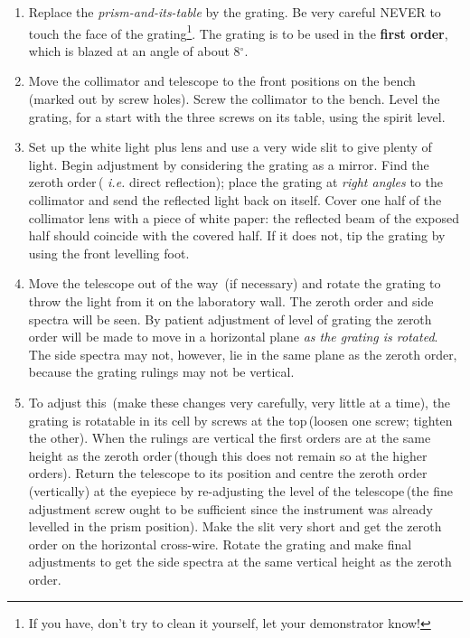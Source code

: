 \documentclass[12pt]{article}
\newcommand{\ie}{ {\em i.e. }}
\begin{document}
\begin{enumerate}

\item Replace the {\sl prism-and-its-table} by the grating. Be very careful NEVER to touch the face of the grating\footnote{If you have, don't try to clean it yourself, let your demonstrator know!}. The grating is to be used in the {\bf first order}, which is blazed at an angle of about 8$^\circ$.

\item Move the collimator and telescope to the front positions on the bench\,(marked out  by screw holes). Screw the collimator to the bench. Level the grating, for a start with the three screws on its table, using the spirit level.

\item Set up the white light plus lens and use a very wide slit to give plenty of light. Begin  adjustment by considering the grating as a mirror. Find the zeroth order\,(\ie direct reflection); place the grating at {\sl right angles} to the collimator and send the reflected light back on itself. Cover one half of the collimator lens with a piece of white paper: the reflected beam of the exposed half should coincide with the covered half. If it does not, tip the grating by using the front levelling foot.

\item Move the telescope out of the way~(if necessary) and rotate the grating to throw the light from it on the laboratory wall. The zeroth order and side spectra will be seen. By patient adjustment of level of grating the zeroth order will be made to move in a horizontal plane {\sl as the grating is rotated}. The side spectra may not, however, lie in the same plane as the zeroth order, because the grating rulings may not be vertical.

\item To adjust this~(make these changes very carefully, very little at a time), the grating is rotatable in its cell by screws at the top\,(loosen one  screw; tighten the other). When the rulings are vertical the first orders are at the same height as the zeroth order\,(though this does not remain so at the higher orders). Return the telescope to its position and centre the zeroth order\,(vertically) at the eyepiece by re-adjusting the level of the telescope\,(the fine adjustment screw ought to be sufficient since the instrument was already levelled in the prism position). Make the slit very short and get the zeroth order on the horizontal cross-wire. Rotate the grating and make final adjustments to get the side spectra at the same vertical height as the zeroth order.


\end{enumerate}
\end{document}
